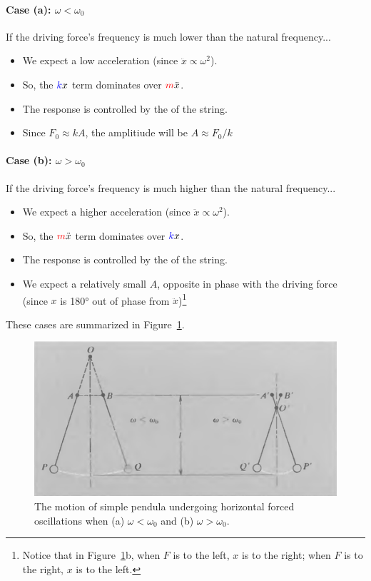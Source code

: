 \paragraph{Case (a): $\omega < \omega_0$}
If the driving force's frequency is much lower than the natural frequency...
\begin{itemize}
	\item We expect a low acceleration (since $\ddot{x} \propto \omega^2$).
	\item So, the $\textcolor{blue}{k}x$ term dominates over $\textcolor{red}{m}\ddot{x}$.
	\item The response is controlled by the  of the string.
	\item Since $F_0 \approx kA$, the amplitiude will be $A\approx F_0/k$
\end{itemize}

\paragraph{Case (b): $\omega > \omega_0$}
If the driving force's frequency is much higher than the natural frequency...
\begin{itemize}
	\item We expect a higher acceleration (since $\ddot{x} \propto \omega^2$).
	\item So, the $\textcolor{red}{m}\ddot{x}$ term dominates over $\textcolor{blue}{k}x$.
	\item The response is controlled by the  of the string.
	\item We expect a relatively small $A$, opposite in phase with the driving force (since $x$ is 180°  out of phase from $\ddot{x}$)\footnote{Notice that in Figure~\ref{ch4:no-damping-pendula}b, when $F$ is to the left, $x$ is to the right; when $F$ is to the right, $x$ is to the left.}
\end{itemize}

These cases are summarized in Figure~\ref{ch4:no-damping-pendula}.

\begin{figure}[h]
	\centering
	\includegraphics[scale=0.7]{phys232/Ch4-forced-no-damping-pendula.png} 
	\caption{The motion of simple pendula undergoing horizontal forced oscillations when (a) $\omega<\omega_0$ and (b) $\omega>\omega_0$.}\label{ch4:no-damping-pendula}
\end{figure}

